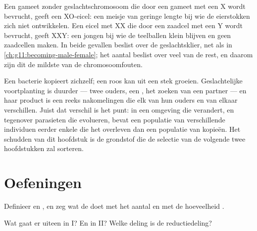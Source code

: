 \begin{example}\label{ex:g12:meiosis-genetic-shuffling:sexchrom}
Een gameet zonder geslachtschromosoom die door een gameet met een X wordt
bevrucht, geeft een XO-eicel: een meisje van geringe lengte bij wie de
eierstokken zich niet ontwikkelen. Een eicel met XX die door een zaadcel
met een Y wordt bevrucht, geeft XXY: een jongen bij wie de teelballen
klein blijven en geen zaadcellen maken. In beide gevallen beslist  over
de geslachtsklier, net als in \cref{ch:g11:becoming-male-female}; het
aantal  beslist over veel van de rest, en daarom zijn dit de
mildste van de chromosoomfouten.
\end{example}

\begin{remark}\label{rem:g12:meiosis-genetic-shuffling:whysex}
Een bacterie kopieert zichzelf; een roos kan uit een stek groeien.
Geslachtelijke voortplanting is duurder --- twee ouders, een , het
zoeken van een partner --- en haar product is een reeks nakomelingen die
elk van hun ouders en van elkaar verschillen. Juist dat verschil is het
punt: in een omgeving die verandert, en tegenover parasieten die
evolueren, bevat een populatie van verschillende individuen eerder enkele
die het overleven dan een populatie van kopieën. Het schudden van dit
hoofdstuk is de grondstof die de selectie van de volgende twee
hoofdstukken zal sorteren.
\end{remark}

\section{Oefeningen}

\begin{exercise}[$\star$]\label{exo:g12:meiosis-genetic-shuffling:1}
Definieer  en , en zeg wat de  doet met het aantal
 en met de hoeveelheid .
\end{exercise}

\begin{exercise}[$\star$]\label{exo:g12:meiosis-genetic-shuffling:2}
Wat gaat er uiteen in  I? En in  II? Welke deling is de
reductiedeling?
\end{exercise}

